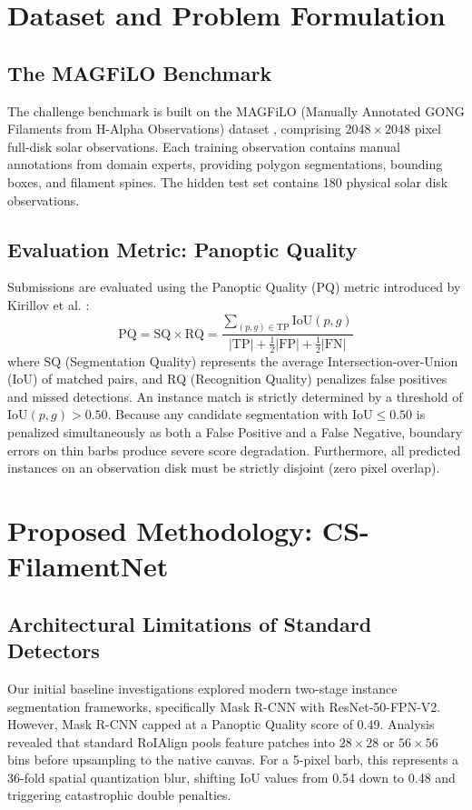 \documentclass[conference]{IEEEtran}
\begin{document}
\section{Dataset and Problem Formulation}

\subsection{The MAGFiLO Benchmark}
The challenge benchmark is built on the MAGFiLO (Manually Annotated GONG Filaments from H-Alpha Observations) dataset \cite{magfilo2024}, comprising $2048 \times 2048$ pixel full-disk solar observations. Each training observation contains manual annotations from domain experts, providing polygon segmentations, bounding boxes, and filament spines. The hidden test set contains 180 physical solar disk observations.

\subsection{Evaluation Metric: Panoptic Quality}
Submissions are evaluated using the Panoptic Quality (PQ) metric introduced by Kirillov et al. \cite{kirillov2019panoptic}:
\begin{equation}
\text{PQ} = \text{SQ} \times \text{RQ} = \frac{\sum_{(p, g) \in \text{TP}} \text{IoU}(p, g)}{|\text{TP}| + \frac{1}{2}|\text{FP}| + \frac{1}{2}|\text{FN}|}
\label{eq:pq}
\end{equation}
where $\text{SQ}$ (Segmentation Quality) represents the average Intersection-over-Union (IoU) of matched pairs, and $\text{RQ}$ (Recognition Quality) penalizes false positives and missed detections. An instance match is strictly determined by a threshold of $\text{IoU}(p, g) > 0.50$. Because any candidate segmentation with $\text{IoU} \le 0.50$ is penalized simultaneously as both a False Positive and a False Negative, boundary errors on thin barbs produce severe score degradation. Furthermore, all predicted instances on an observation disk must be strictly disjoint (zero pixel overlap).

\section{Proposed Methodology: CS-FilamentNet}

\subsection{Architectural Limitations of Standard Detectors}
Our initial baseline investigations explored modern two-stage instance segmentation frameworks, specifically Mask R-CNN with ResNet-50-FPN-V2. However, Mask R-CNN capped at a Panoptic Quality score of 0.49. Analysis revealed that standard RoIAlign pools feature patches into $28 \times 28$ or $56 \times 56$ bins before upsampling to the native canvas. For a 5-pixel barb, this represents a 36-fold spatial quantization blur, shifting IoU values from 0.54 down to 0.48 and triggering catastrophic double penalties.
\end{document}
